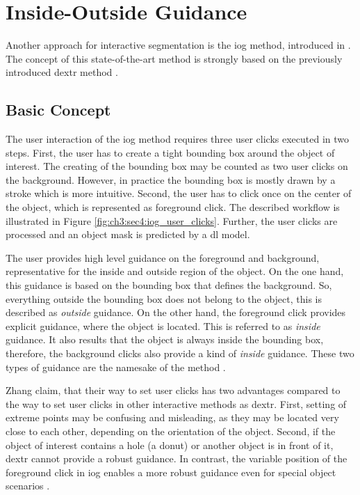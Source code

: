 
\section{Inside-Outside Guidance}\label{ord:ch3:sec4}

Another approach for interactive segmentation is the \gls{iog} method, introduced in \cite{Zha20-IOG}.
The concept of this state-of-the-art method is strongly based on the previously introduced \gls{dextr} method \cite{Man18-DEXTR}.

\subsection{Basic Concept}\label{ord:ch3:sec4:subsec1}
The user interaction of the \gls{iog} method requires three user clicks executed in two steps.
First, the user has to create a tight bounding box around the object of interest. 
The creating of the bounding box may be counted as two user clicks on the background.
However, in practice the bounding box is mostly drawn by a stroke which is more intuitive.
Second, the user has to click once on the center of the object, which is represented as foreground click. 
The described workflow is illustrated in Figure \ref{fig:ch3:sec4:iog_user_clicks}.
Further, the user clicks are processed and an object mask is predicted by a \gls{dl} model.

The user provides high level guidance on the foreground and background, representative for the inside and outside region of the object.
On the one hand, this guidance is based on the bounding box that defines the background.
So, everything outside the bounding box does not belong to the object, this is described as \textit{outside} guidance.
On the other hand, the foreground click provides explicit guidance, where the object is located.
This is referred to as \textit{inside} guidance.
It also results that the object is always inside the bounding box, therefore, the background clicks also provide a kind of \textit{inside} guidance. 
These two types of guidance are the namesake of the method .

Zhang \etal claim, that their way to set user clicks has two advantages compared to the way to set user clicks in other interactive methods as \gls{dextr}.
First, setting of extreme points may be confusing and misleading, as they may be located very close to each other, depending on the orientation of the object.
Second, if the object of interest contains a hole (\eg a donut) or another object is in front of it, \gls{dextr} cannot provide a robust guidance.
In contrast, the variable position of the foreground click in \gls{iog} enables a more robust guidance even for special object scenarios \cite{Zha20-IOG}.

